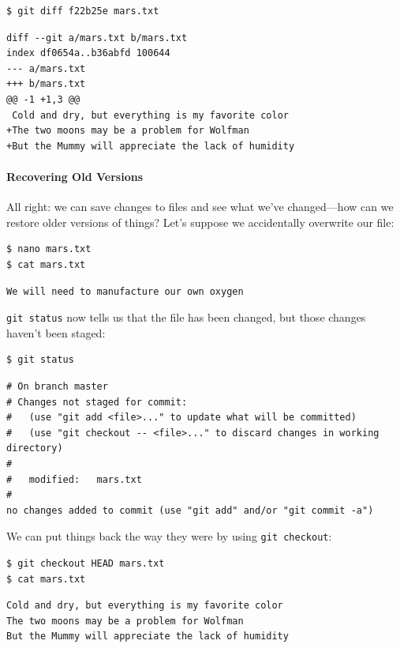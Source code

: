 \documentclass[]{book}
\begin{document}
\begin{verbatim}
$ git diff f22b25e mars.txt
\end{verbatim}

\begin{verbatim}
diff --git a/mars.txt b/mars.txt
index df0654a..b36abfd 100644
--- a/mars.txt
+++ b/mars.txt
@@ -1 +1,3 @@
 Cold and dry, but everything is my favorite color
+The two moons may be a problem for Wolfman
+But the Mummy will appreciate the lack of humidity
\end{verbatim}

\mbox{}\paragraph{Recovering Old Versions}

All right: we can save changes to files and see what we've changed---how
can we restore older versions of things? Let's suppose we accidentally
overwrite our file:

\begin{verbatim}
$ nano mars.txt
$ cat mars.txt
\end{verbatim}

\begin{verbatim}
We will need to manufacture our own oxygen
\end{verbatim}

\texttt{git status} now tells us that the file has been changed, but
those changes haven't been staged:

\begin{verbatim}
$ git status
\end{verbatim}

\begin{verbatim}
# On branch master
# Changes not staged for commit:
#   (use "git add <file>..." to update what will be committed)
#   (use "git checkout -- <file>..." to discard changes in working directory)
#
#   modified:   mars.txt
#
no changes added to commit (use "git add" and/or "git commit -a")
\end{verbatim}

We can put things back the way they were by using \texttt{git checkout}:

\begin{verbatim}
$ git checkout HEAD mars.txt
$ cat mars.txt
\end{verbatim}

\begin{verbatim}
Cold and dry, but everything is my favorite color
The two moons may be a problem for Wolfman
But the Mummy will appreciate the lack of humidity
\end{verbatim}
\end{document}

